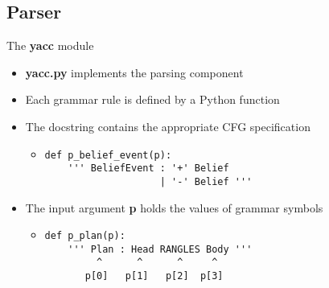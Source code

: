 \subsection{Parser}
\begin{frame}[fragile]{The \textbf{yacc} module}
  \begin{itemize}
    \item \textbf{yacc.py} implements the parsing component
\N
    \item Each grammar rule is defined by a Python function
\n
    \item The docstring contains the appropriate CFG specification
\n
    \begin{itemize}
     \item 
      \begin{verbatim} 
def p_belief_event(p):
    ''' BeliefEvent : '+' Belief 
                    | '-' Belief ''' \end{verbatim}
    \end{itemize}
\n
    \item The input argument \textbf{p} holds the values of grammar symbols
\n
    \begin{itemize}
      \item 
      \begin{verbatim} 
def p_plan(p):
    ''' Plan : Head RANGLES Body ''' 
         ^      ^      ^     ^
       p[0]   p[1]   p[2]  p[3] \end{verbatim}
    \end{itemize}
  \end{itemize}
%
\N\N
\end{frame}


